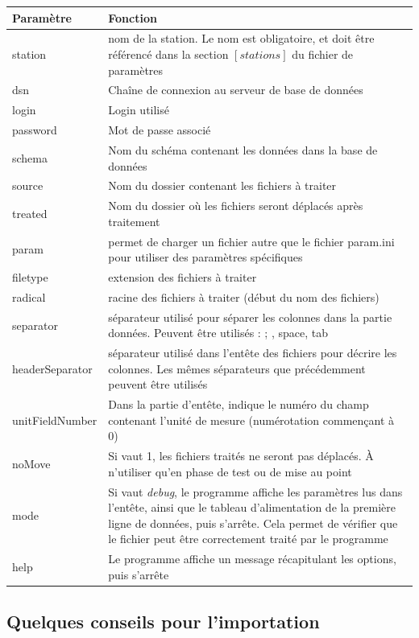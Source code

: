 \documentclass[12pt,a4paper]{article}
\begin{document}
\begin{tabular}{|l|>{\raggedright\arraybackslash}p{12cm}|}
\hline 
Paramètre & Fonction \\ 
\hline 
station & nom de la station. Le nom est obligatoire, et doit être référencé dans la section $\left[ stations \right]$  du fichier de paramètres \\
dsn & Chaîne de connexion au serveur de base de données\\
login & Login utilisé \\
password & Mot de passe associé \\
schema & Nom du schéma contenant les données dans la base de données \\
source & Nom du dossier contenant les fichiers à traiter \\
treated & Nom du dossier où les fichiers seront déplacés après traitement \\
param & permet de charger un fichier autre que le fichier param.ini pour utiliser des paramètres spécifiques \\
filetype & extension des fichiers à traiter \\
radical & racine des fichiers à traiter (début du nom des fichiers)\\
separator & séparateur utilisé pour séparer les colonnes dans la partie données. Peuvent être utilisés : ; , space, tab \\
headerSeparator & séparateur utilisé dans l'entête des fichiers pour décrire les colonnes. Les mêmes séparateurs que précédemment peuvent être utilisés \\
unitFieldNumber & Dans la partie d'entête, indique le numéro du champ contenant l'unité de mesure (numérotation commençant à 0)\\
noMove & Si vaut 1, les fichiers traités ne seront pas déplacés. À n'utiliser qu'en phase de test ou de mise au point \\
mode & Si vaut \textit{debug}, le programme affiche les paramètres lus dans l'entête, ainsi que le tableau d'alimentation de la première ligne de données, puis s'arrête. Cela permet de vérifier que le fichier peut être correctement traité par le programme \\
help & Le programme affiche un message récapitulant les options, puis s'arrête \\
\hline
\end{tabular}

\subsection{Quelques conseils pour l'importation}
\end{document}
